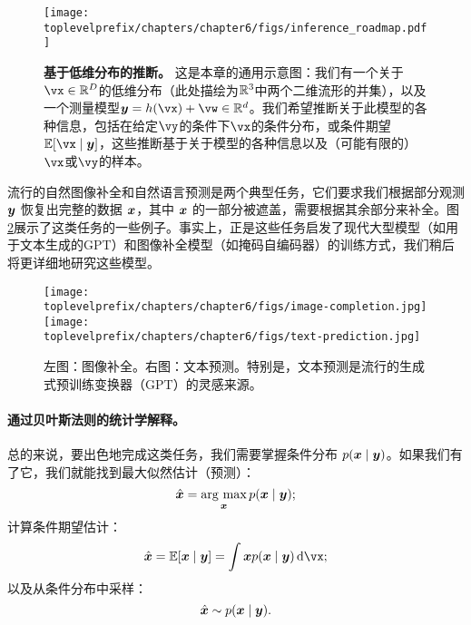 \documentclass[../../book-main.tex]{subfiles}
\begin{document}
\begin{figure}
  \centering 
  \texttt{[image: \\toplevelprefix/chapters/chapter6/figs/inference\_roadmap.pdf]}
  \caption{\small \textbf{基于低维分布的推断。} 这是本章的通用示意图：我们有一个关于\(\vx \in \R^{D}\)的低维分布（此处描绘为\(\mathbb{R}^{3}\)中两个二维流形的并集），以及一个测量模型\(\y = h(\vx) + \vw \in \R^{d}\)。我们希望推断关于此模型的各种信息，包括在给定\(\vy\)的条件下\(\vx\)的条件分布，或条件期望\(\mathbb{E}[\vx \mid \y]\)，这些推断基于关于模型的各种信息以及（可能有限的）\(\vx\)或\(\vy\)的样本。}
  \label{fig:inference_roadmap}
\end{figure}

\begin{example}[图像补全与文本预测]
流行的自然图像补全和自然语言预测是两个典型任务，它们要求我们根据部分观测 $\bm{y}$ 恢复出完整的数据 $\bm{x}$，其中 $\bm{x}$ 的一部分被遮盖，需要根据其余部分来补全。图\ref{fig:image-text-completion}展示了这类任务的一些例子。事实上，正是这些任务启发了现代大型模型（如用于文本生成的GPT）和图像补全模型（如掩码自编码器）的训练方式，我们稍后将更详细地研究这些模型。
    \begin{figure}
        \centering
        \texttt{[image: \\toplevelprefix/chapters/chapter6/figs/image-completion.jpg]} \hspace{10mm} \texttt{[image: \\toplevelprefix/chapters/chapter6/figs/text-prediction.jpg]}
        \caption{左图：图像补全。右图：文本预测。特别是，文本预测是流行的生成式预训练变换器（GPT）的灵感来源。}
        \label{fig:image-text-completion}
    \end{figure}
\end{example}


\paragraph{通过贝叶斯法则的统计学解释。}
总的来说，要出色地完成这类任务，我们需要掌握条件分布 $p(\bm{x}\mid \bm{y})$。如果我们有了它，我们就能找到最大似然估计（预测）：
\begin{equation}
  \hat{\bm{x}} = \operatorname*{arg\ max}_{\bm{x}} p(\bm{x}\mid \bm{y});
\end{equation}
计算条件期望估计：
\begin{equation}
  \hat{\x} = \mathbb{E}[\x \mid \y] = \int \x p(\x\mid \y)\odif{\vx};
\end{equation}
以及从条件分布中采样：
\begin{equation}
  \hat{\bm{x}} \sim p(\bm{x} \mid \bm{y}).
\end{equation}
\end{document}
